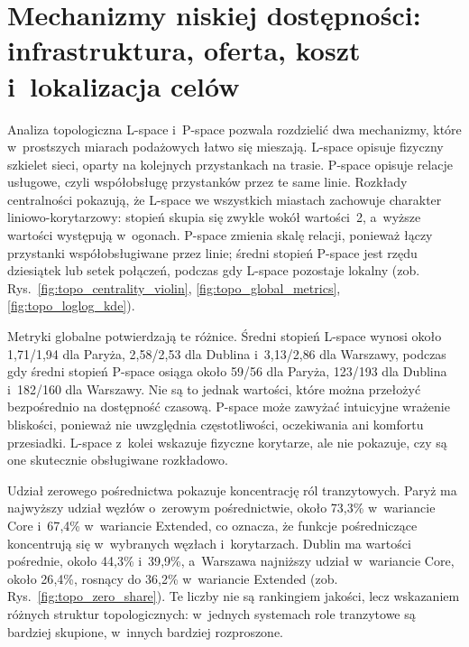 \documentclass{pracamgr}
\begin{document}
\section{Mechanizmy niskiej dostępności: infrastruktura, oferta, koszt i~lokalizacja celów}\label{section:ch5_mechanizmy_niskiej_dostepnosci}

Analiza topologiczna \mbox{L-space} i~\mbox{P-space} pozwala rozdzielić dwa mechanizmy, które w~prostszych miarach podażowych łatwo się mieszają. \mbox{L-space} opisuje fizyczny szkielet sieci, oparty na kolejnych przystankach na trasie. \mbox{P-space} opisuje relacje usługowe, czyli współobsługę przystanków przez te same linie. Rozkłady centralności pokazują, że \mbox{L-space} we wszystkich miastach zachowuje charakter liniowo-korytarzowy: stopień skupia się zwykle wokół wartości~2, a~wyższe wartości występują w~ogonach. \mbox{P-space} zmienia skalę relacji, ponieważ łączy przystanki współobsługiwane przez linie; średni stopień \mbox{P-space} jest rzędu dziesiątek lub setek połączeń, podczas gdy \mbox{L-space} pozostaje lokalny (zob. Rys.~\ref{fig:topo_centrality_violin}, \ref{fig:topo_global_metrics}, \ref{fig:topo_loglog_kde}).

Metryki globalne potwierdzają te różnice. Średni stopień \mbox{L-space} wynosi około 1{,}71/1{,}94 dla Paryża, 2{,}58/2{,}53 dla Dublina i~3{,}13/2{,}86 dla Warszawy, podczas gdy średni stopień \mbox{P-space} osiąga około 59/56 dla Paryża, 123/193 dla Dublina i~182/160 dla Warszawy. Nie są to jednak wartości, które można przełożyć bezpośrednio na dostępność czasową. \mbox{P-space} może zawyżać intuicyjne wrażenie bliskości, ponieważ nie uwzględnia częstotliwości, oczekiwania ani komfortu przesiadki. \mbox{L-space} z~kolei wskazuje fizyczne korytarze, ale nie pokazuje, czy są one skutecznie obsługiwane rozkładowo.

Udział zerowego pośrednictwa pokazuje koncentrację ról tranzytowych. Paryż ma najwyższy udział węzłów o~zerowym pośrednictwie, około 73{,}3\% w~wariancie \mbox{Core} i~67{,}4\% w~wariancie \mbox{Extended}, co oznacza, że funkcje pośredniczące koncentrują się w~wybranych węzłach i~korytarzach. Dublin ma wartości pośrednie, około 44{,}3\% i~39{,}9\%, a~Warszawa najniższy udział w~wariancie \mbox{Core}, około 26{,}4\%, rosnący do 36{,}2\% w~wariancie \mbox{Extended} (zob. Rys.~\ref{fig:topo_zero_share}). Te liczby nie są rankingiem jakości, lecz wskazaniem różnych struktur topologicznych: w~jednych systemach role tranzytowe są bardziej skupione, w~innych bardziej rozproszone.
\end{document}
